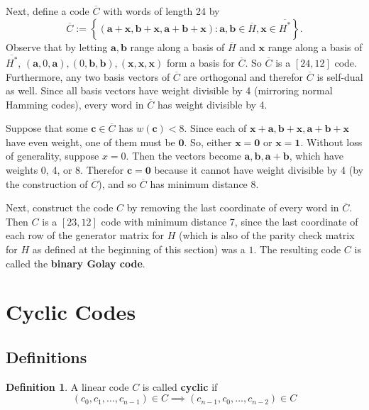 \documentclass{article}
\newcommand{\ext}[1]{\overline{#1}}
\renewcommand{\=}{\equiv}
\newcommand{\set}[1]{\left\{ #1 \right\}}
\renewcommand{\v}{\mathbf}
\newcommand{\x}{{\v x}}
\theoremstyle{plain}
\theoremstyle{definition}
\newtheorem{defn}{Definition}[subsection]
\begin{document}
Next, define a code $\ext{C}$ with words of length 24 by
$$ \ext{C} := \set{ (\v a + \x, \v b + \x, \v a + \v b + \x) : \v a,\v b \in \ext{H}, \x \in \ext{H^*} }. $$
Observe that by letting $\v a, \v b$ range along a basis of $\ext H$ and $\x$ range along a basis of $\ext{H^*}$, $(\v a, 0, \v a), (0, \v b, \v b), (\x, \x, \x)$ form a basis for $\ext{C}$.
So $\ext{C}$ is a $[24,12]$ code.
Furthermore, any two basis vectors of $\ext{C}$ are orthogonal and therefor $\ext{C}$ is self-dual as well.
Since all basis vectors have weight divisible by 4 (mirroring normal Hamming codes), every word in $\ext{C}$ has weight divisible by 4.

Suppose that some $\v c \in \ext{C}$ has $w(\v c) < 8$.
Since each of $\x + \v a, \v b + \x, \v a + \v b + \x$ have even weight, one of them must be $\v 0$.
So, either $\x = \v 0$ or $\x = \v 1$.
Without loss of generality, suppose $x = 0$.
Then the vectors become $\v a, \v b, \v a + \v b$, which have weights 0, 4, or 8.
Therefor $\v c = \v 0$ because it cannot have weight divisible by 4 (by the construction of $\ext{C}$), and so $\ext{C}$ has minimum distance 8.

Next, construct the code $C$ by removing the last coordinate of every word in $\ext{C}$.
Then $C$ is a $[23,12]$ code with minimum distance 7, since the last coordinate of each row of the generator matrix for $H$ (which is also of the parity check matrix for $H$ as defined at the beginning of this section) was a $1$.
The resulting code $C$ is called the \textbf{binary Golay code}.

\section{Cyclic Codes}

\subsection{Definitions}

\begin{defn}
  A linear code $C$ is called \textbf{cyclic} if
  $$ (c_0, c_1, \dots, c_{n-1}) \in C \implies (c_{n-1}, c_0, \dots, c_{n-2}) \in C $$
\end{defn}
\end{document}
